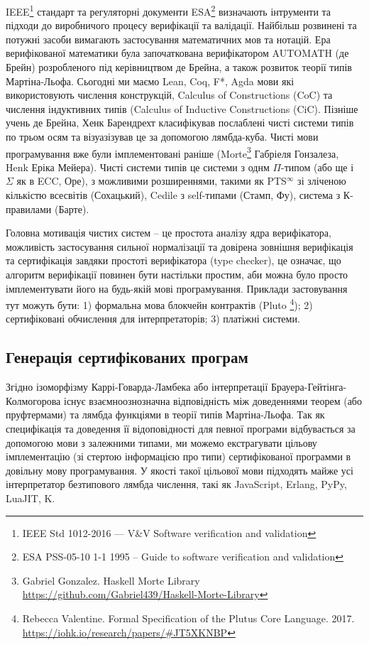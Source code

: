 IEEE\footnote{IEEE Std 1012-2016  --- V\&V Software verification and validation} стандарт
та регуляторні документи ESA\footnote{ESA PSS-05-10 1-1 1995 -- Guide to software verification and validation}
визначають інтрументи та підходи до виробничого процесу верифікації та валідації.
Найбільш розвинені та потужні засоби вимагають застосування математичних мов та нотацій.
Ера верифікованої математики була започаткована верифікатором AUTOMATH\cite{deBruijn83} (де Брейн) розробленого
під керівництвом де Брейна, а також розвиток теорії типів Мартіна-Льофа\cite{Lof84}.
Сьогодні ми маємо Lean, Coq, F*, Agda мови які використовують числення
конструкцій, Calculus of Constructions\cite{Coq88} (CoC)
та числення індуктивних типів (Calculus of Inductive Constructions\cite{Pfenning89} (CiC).
Пізніше учень де Брейна, Хенк Барендрехт класифікував послаблені чисті
системи типів по трьом осям та візуазізував це за допомогою лямбда-куба\cite{Henk93}.
Чисті мови програмування вже були імплементовані раніше
(Morte\footnote{Gabriel Gonzalez. Haskell Morte Library \url{https://github.com/Gabriel439/Haskell-Morte-Library}} Габріеля Гонзалеза, Henk\cite{Erik97} Еріка Мейера).
Чисті системи типів це системи з однм $\Pi$-типом (або ще і $\Sigma$ як в ECC\cite{Ore92}, Оре),
з можливими розширеннями, такими як PTS$^\infty$ зі зліченою кількістю всесвітів\cite{Tonpa18} (Сохацький),
Cedile з self-типами\cite{Fu14}\cite{Stump17} (Стамп, Фу), система з К-правилами\cite{Barthe95} (Барте).

Головна мотивація чистих систем -- це простота аналізу ядра верифікатора,
можливість застосування сильної нормалізації та довірена зовнішня верифікація
та сертифікація завдяки простоті верифікатора (type checker), це означає, що
алгоритм верифікації повинен бути настільки простим, аби можна було
просто імплементувати його на будь-якій мові програмування. Приклади застовування
тут можуть бути:
1) формальна мова блокчейн контрактів (Pluto
   \footnote{Rebecca Valentine. Formal Specification of the Plutus Core Language. 2017.
             \url{https://iohk.io/research/papers/#JT5XKNBP}});
2) сертифіковані обчислення для інтерпретаторів;
3) платіжні системи.

\subsection{Генерація сертифікованих програм}
Згідно ізоморфізму Каррі-Говарда-Ламбека або інтерпретації Брауера-Гейтінга-Колмогорова
існує взаємноознозначна відповідність між доведеннями теорем (або пруфтермами)
та лямбда функціями в теорії типів Мартіна-Льофа\cite{Lof84}.
Так як специфікація та доведення її відоповідності для певної програми
відбувається за допомогою мови з залежними типами, ми можемо екстрагувати
цільову імплементацію (зі стертою інформацією про типи) сертифікованої программи
в довільну мову програмування. У якості такої цільової мови підходять
майже усі інтерпретатор безтипового лямбда числення, такі як JavaScript,
Erlang, PyPy, LuaJIT, K.

